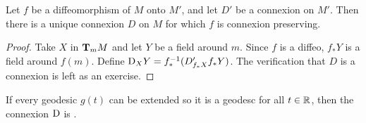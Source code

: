 \documentclass[../main]{subfiles}
\begin{document}
\begin{theorem} \label{thm:ch5.1.3}
Let $f$ be a diffeomorphism of $M$ onto $M'$, and let $D'$ be a connexion on $M'$. Then there is a unique connexion $D$ on $M$ for which $f$ is connexion preserving.
\end{theorem}

\begin{proof}
Take $X$ in $\tangentspace{M}{m}$ and let $Y$ be a field around $m$. Since $f$ is a diffeo, $f_* Y$ is a field around $f(m)$. Define $\connection_X Y = f_*^{-1}(D'_{f_*X} f_* Y)$. The verification that $D$ is a connexion is left as an exercise.
\end{proof}



If every geodesic $g(t)$ can be extended so it is a geodesc for all $t \in \bbR$, then the connexion $\connection$ is .
\end{document}
